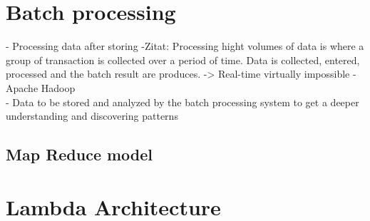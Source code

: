 \section{Batch processing}
- Processing data after storing 
-Zitat: Processing hight volumes of data is where a group of transaction is collected
over a period of time. Data is collected, entered, processed and the batch
result are produces. -> Real-time virtually impossible
- Apache Hadoop\\
- Data to be stored and analyzed by the batch processing system to get a deeper
understanding and discovering patterns
\subsection{Map Reduce model }

\section{Lambda Architecture}
\cite{PrpSvyOfDSPS}


